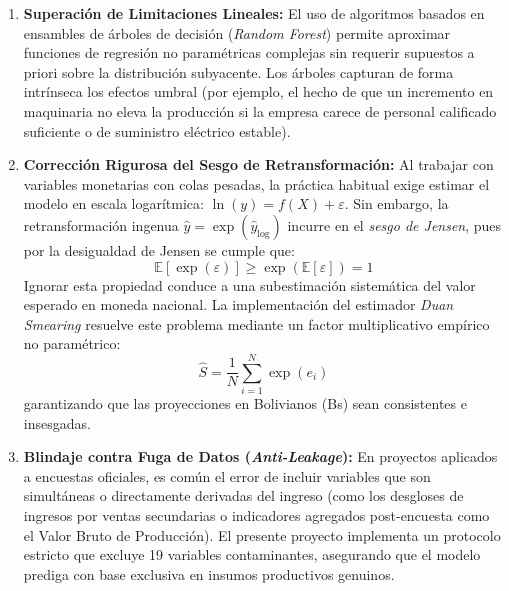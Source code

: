 \begin{enumerate}
    \item \textbf{Superación de Limitaciones Lineales:} El uso de algoritmos basados en ensambles de árboles de decisión (\textit{Random Forest}) permite aproximar funciones de regresión no paramétricas complejas sin requerir supuestos a priori sobre la distribución subyacente. Los árboles capturan de forma intrínseca los efectos umbral (por ejemplo, el hecho de que un incremento en maquinaria no eleva la producción si la empresa carece de personal calificado suficiente o de suministro eléctrico estable).
    \item \textbf{Corrección Rigurosa del Sesgo de Retransformación:} Al trabajar con variables monetarias con colas pesadas, la práctica habitual exige estimar el modelo en escala logarítmica: $\ln(y) = f(X) + \varepsilon$. Sin embargo, la retransformación ingenua $\hat{y} = \exp(\hat{y}_{\log})$ incurre en el \textit{sesgo de Jensen}, pues por la desigualdad de Jensen se cumple que:
    \begin{equation}
        \mathbb{E}[\exp(\varepsilon)] \ge \exp(\mathbb{E}[\varepsilon]) = 1
        \label{eq:jensen}
    \end{equation}
    Ignorar esta propiedad conduce a una subestimación sistemática del valor esperado en moneda nacional. La implementación del estimador \textit{Duan Smearing} \citep{duan1983smearing} resuelve este problema mediante un factor multiplicativo empírico no paramétrico:
    \begin{equation}
        \hat{S} = \frac{1}{N} \sum_{i=1}^{N} \exp(e_i)
        \label{eq:duan_factor}
    \end{equation}
    garantizando que las proyecciones en Bolivianos (Bs) sean consistentes e insesgadas.
    \item \textbf{Blindaje contra Fuga de Datos (\textit{Anti-Leakage}):} En proyectos aplicados a encuestas oficiales, es común el error de incluir variables que son simultáneas o directamente derivadas del ingreso (como los desgloses de ingresos por ventas secundarias o indicadores agregados post-encuesta como el Valor Bruto de Producción). El presente proyecto implementa un protocolo estricto que excluye 19 variables contaminantes, asegurando que el modelo prediga con base exclusiva en insumos productivos genuinos.
\end{enumerate}

